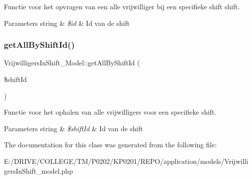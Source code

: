 Functie voor het opvragen van een alle vrijwilliger bij een specifieke shift shift. 
\begin{DoxyParams}[1]{Parameters}
string & {\em \$id} & Id van de shift \\
\hline
\end{DoxyParams}
\mbox{\label{class_vrijwilligers_in_shift___model_a8a9b3e545063a3b69d118ac1109b3da4}} 
\subsubsection{\texorpdfstring{get\+All\+By\+Shift\+Id()}{getAllByShiftId()}}
{\footnotesize\ttfamily Vrijwilligers\+In\+Shift\+\_\+\+Model\+::get\+All\+By\+Shift\+Id (\begin{DoxyParamCaption}\item[{}]{\$shift\+Id }\end{DoxyParamCaption})}

Functie voor het ophalen van alle vrijwilligers voor een specifieke shift. 
\begin{DoxyParams}[1]{Parameters}
string & {\em \$shift\+Id} & Id van de shift \\
\hline
\end{DoxyParams}


The documentation for this class was generated from the following file\+:\begin{DoxyCompactItemize}
\item 
E\+:/\+D\+R\+I\+V\+E/\+C\+O\+L\+L\+E\+G\+E/\+T\+M/\+P0202/\+K\+P0201/\+R\+E\+P\+O/application/models/Vrijwilligers\+In\+Shift\+\_\+model.\+php\end{DoxyCompactItemize}
